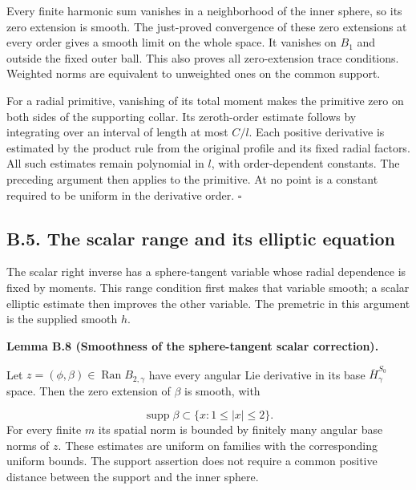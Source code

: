 \documentclass[
  english,
  11pt,
  reqno]{amsart}
\makeatletter
\newcommand{\pandocstatementheading}[1]{%
  \par\addpenalty{\@beginparpenalty}%
  \addvspace{.5\baselineskip plus .2\baselineskip minus .2\baselineskip}%
  {\normalfont\bfseries #1\par}%
  \nobreak\@afterindenttrue\@afterheading
}
\makeatother
\begin{document}
Every finite harmonic sum vanishes in a neighborhood of the inner
sphere, so its zero extension is smooth. The just-proved convergence of
these zero extensions at every order gives a smooth limit on the whole
space. It vanishes on \(B_1\) and outside the fixed outer ball. This
also proves all zero-extension trace conditions. Weighted norms are
equivalent to unweighted ones on the common support.

For a radial primitive, vanishing of its total moment makes the
primitive zero on both sides of the supporting collar. Its zeroth-order
estimate follows by integrating over an interval of length at most
\(C/l\). Each positive derivative is estimated by the product rule from
the original profile and its fixed radial factors. All such estimates
remain polynomial in \(l\), with order-dependent constants. The
preceding argument then applies to the primitive. At no point is a
constant required to be uniform in the derivative order.
\hfill\(\square\)

\subsection{B.5. The scalar range and its elliptic
equation}\label{b.5.-the-scalar-range-and-its-elliptic-equation}\label{sec:online-extension-scalar-range}

The scalar right inverse has a sphere-tangent variable whose radial
dependence is fixed by moments. This range condition first makes that
variable smooth; a scalar elliptic estimate then improves the other
variable. The premetric in this argument is the supplied smooth
\(\widehat h\).

\pandocstatementheading{\leavevmode{}\label{lem:online-extension-scalar-tangent-smooth}Lemma B.8 (Smoothness of the sphere-tangent scalar correction).}

Let \(z=(\phi,\beta)\in\operatorname{Ran}B_{2,\gamma}\) have every
angular Lie derivative in its base \(\overline H^{S_0}_\gamma\) space.
Then the zero extension of \(\beta\) is smooth, with

\label{eq:online-extension-scalar-tangent-support} \[
\operatorname{supp}\beta\subset\{x:1\le|x|\le2\}.
\] For every finite \(m\) its spatial norm is bounded by finitely many
angular base norms of \(z\). These estimates are uniform on families
with the corresponding uniform bounds. The support assertion does not
require a common positive distance between the support and the inner
sphere.
\end{document}
